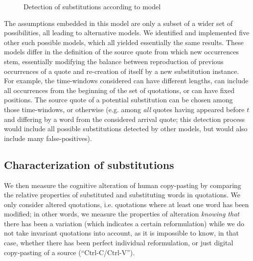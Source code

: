 \begin{figure}[h]
    \centering
    \def\svgwidth{\textwidth}
    \small
    
    \caption{Detection of substitutions according to model }
    \label{fig:model-slidetimebags}
\end{figure}

The assumptions embedded in this model are only a subset of a wider set of possibilities, all leading to alternative models. We identified and implemented five other such possible models, which all yielded essentially the same results. These models differ in the definition of the source quote from which new occurrences stem, essentially modifying the balance between reproduction of previous occurrences of a quote and re-creation of itself by a new substitution instance. For example, the time-windows considered can have different lengths, can include all occurrences from the beginning of the set of quotations, or can have fixed positions. The source quote of a potential substitution can be chosen among those time-windows, or otherwise (e.g. among \emph{all} quotes having appeared before $t$ and differing by a word from the considered arrival quote; this detection process would include all possible substitutions detected by other models, but would also include many false-positives).


\subsection{Characterization of substitutions}

We then measure the cognitive alteration of human copy-pasting by comparing the relative properties of substituted and substituting words in quotations.  We only consider altered quotations, \hbox{i.e.} quotations where at least one word has been modified; in other words, we measure the properties of alteration \emph{knowing that} there has been a variation (which indicates a certain reformulation) while we do not take invariant quotations into account, as it is impossible to know, in that case, whether there has been perfect individual reformulation, or just digital copy-pasting of a source (``{\sf Ctrl-C}/{\sf Ctrl-V}'').

